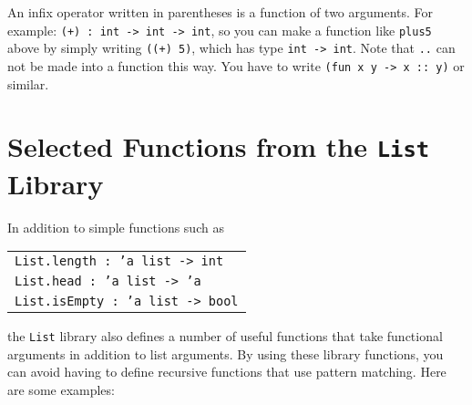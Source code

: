 \documentclass[a4paper]{article}
\begin{document}
An infix operator written in parentheses is a function of two
arguments.  For example: \texttt{(+) : int -> int -> int}, so you can
make a function like \texttt{plus5} above by simply writing
\texttt{((+) 5)}, which has type \texttt{int -> int}.  Note that
\texttt{..} can not be made into a function this way.  You have to
write \texttt{(fun x y -> x :: y)} or similar.

\section{Selected Functions from the \texttt{List} Library}

In addition to simple functions such as

\vspace{1ex}

\begin{tabular}{l}
\texttt{List.length : 'a list -> int} \\
\texttt{List.head : 'a list -> 'a} \\
\texttt{List.isEmpty : 'a list -> bool}
\end{tabular}

\vspace{1ex}

\noindent
the \texttt{List} library also defines a number
of useful functions that take functional arguments in addition to list
arguments.  By using these library functions, you can avoid having to
define recursive functions that use pattern matching.  Here are some
examples:
\end{document}
